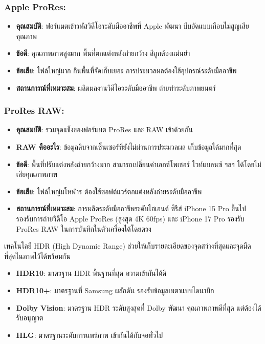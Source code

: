 \subsubsection*{Apple ProRes:}

\begin{itemize}
  \item \textbf{คุณสมบัติ}: ฟอร์แมตเข้ารหัสวิดีโอระดับมืออาชีพที่ Apple พัฒนา บีบอัดแบบเกือบไม่สูญเสียคุณภาพ
  \item \textbf{ข้อดี}: คุณภาพภาพสูงมาก พื้นที่ตกแต่งหลังถ่ายกว้าง สีถูกต้องแม่นยำ
  \item \textbf{ข้อเสีย}: ไฟล์ใหญ่มาก กินพื้นที่จัดเก็บเยอะ การประมวลผลต้องใช้อุปกรณ์ระดับมืออาชีพ
  \item \textbf{สถานการณ์ที่เหมาะสม}: ผลิตผลงานวิดีโอระดับมืออาชีพ ถ่ายทำระดับภาพยนตร์
\end{itemize}

\subsubsection*{ProRes RAW:}

\begin{itemize}
  \item \textbf{คุณสมบัติ}: รวมจุดแข็งของฟอร์แมต ProRes และ RAW เข้าด้วยกัน
  \item \textbf{RAW คืออะไร}: ข้อมูลดิบจากเซ็นเซอร์ที่ยังไม่ผ่านการประมวลผล เก็บข้อมูลได้มากที่สุด
  \item \textbf{ข้อดี}: พื้นที่ปรับแต่งหลังถ่ายกว้างมาก สามารถเปลี่ยนค่าเอกซ์โพเชอร์ ไวท์แบลนซ์ ฯลฯ ได้โดยไม่เสียคุณภาพภาพ
  \item \textbf{ข้อเสีย}: ไฟล์ใหญ่มโหฬาร ต้องใช้ซอฟต์แวร์ตกแต่งหลังถ่ายระดับมืออาชีพ
  \item \textbf{สถานการณ์ที่เหมาะสม}: การผลิตระดับมืออาชีพระดับไฮเอนด์ ซีรีส์ iPhone 15 Pro ขึ้นไปรองรับการถ่ายวิดีโอ Apple ProRes (สูงสุด 4K 60fps) และ iPhone 17 Pro รองรับ ProRes RAW ในการบันทึกในตัวเครื่องได้โดยตรง
\end{itemize}


เทคโนโลยี HDR (High Dynamic Range) ช่วยให้เก็บรายละเอียดของจุดสว่างที่สุดและจุดมืดที่สุดในภาพไว้ได้พร้อมกัน

\begin{itemize}
  \item \textbf{HDR10}: มาตรฐาน HDR พื้นฐานที่สุด ความเข้ากันได้ดี
  \item \textbf{HDR10+}: มาตรฐานที่ Samsung ผลักดัน รองรับข้อมูลเมตาแบบไดนามิก
  \item \textbf{Dolby Vision}: มาตรฐาน HDR ระดับสูงสุดที่ Dolby พัฒนา คุณภาพภาพดีที่สุด แต่ต้องได้รับอนุญาต
  \item \textbf{HLG}: มาตรฐานระดับการแพร่ภาพ เข้ากันได้กับจอทั่วไป
\end{itemize}

